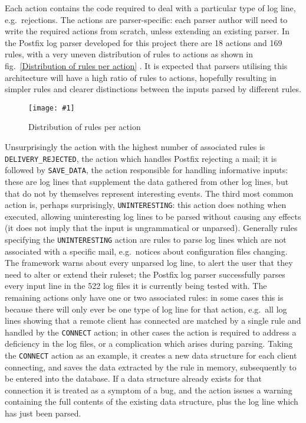 \documentclass[draft]{svmult}
\newcommand{\showgraph}[3]{%
    \begin{figure}[btp]%
        \texttt{[image: \#1]}%
        \caption{#2}\label{#3}%
    \end{figure}%
}
\newcommand{\refwithlabel}[2]{%
    #1~\vref{#2}%
}
\newcommand{\graphref}[1]{%
    \refwithlabel{fig.}{#1}%
}
\newcommand{\numberOFrules}[0]{%
    169%
}
\newcommand{\numberOFlogFILESall}[0]{%
    522%
}
\newcommand{\numberOFactions}[0]{%
    18%
}
\begin{document}
Each action contains the code required to deal with a particular type of
log line, e.g.\ rejections.  The actions are parser-specific: each parser
author will need to write the required actions from scratch, unless
extending an existing parser.  In the Postfix log parser developed for this
project there are \numberOFactions{} actions and \numberOFrules{} rules,
with a very uneven distribution of rules to actions as shown in
\graphref{Distribution of rules per action}.  It is expected that parsers
utilising this architecture will have a high ratio of rules to actions,
hopefully resulting in simpler rules and clearer distinctions between the
inputs parsed by different rules.
\showgraph{build/graph-action-distribution}{Distribution of rules per
action}{Distribution of rules per action} Unsurprisingly the action with
the highest number of associated rules is \texttt{DELIVERY\_REJECTED}, the
action which handles Postfix rejecting a mail; it is followed by
\texttt{SAVE\_DATA}, the action responsible for handling informative
inputs: these are log lines that supplement the data gathered from other
log lines, but that do not by themselves represent interesting events.  The
third most common action is, perhaps surprisingly, \texttt{UNINTERESTING}:
this action does nothing when executed, allowing uninteresting log lines to
be parsed without causing any effects (it does not imply that the input is
ungrammatical or unparsed).  Generally rules specifying the
\texttt{UNINTERESTING} action are rules to parse log lines which are not
associated with a specific mail, e.g.\ notices about configuration files
changing.  The framework warns about every unparsed log line, to alert the
user that they need to alter or extend their ruleset; the Postfix log
parser successfully parses every input line in the \numberOFlogFILESall{}
log files it is currently being tested with.  The remaining actions only
have one or two associated rules: in some cases this is because there will
only ever be one type of log line for that action, e.g.\ all log lines
showing that a remote client has connected are matched by a single rule and
handled by the \texttt{CONNECT} action; in other cases the action is
required to address a deficiency in the log files, or a complication which
arises during parsing.  Taking the \texttt{CONNECT} action as an example,
it creates a new data structure for each client connecting, and saves the
data extracted by the rule in memory, subsequently to be entered into the
database.  If a data structure already exists for that connection it is
treated as a symptom of a bug, and the action issues a warning containing
the full contents of the existing data structure, plus the log line which
has just been parsed.
\end{document}
